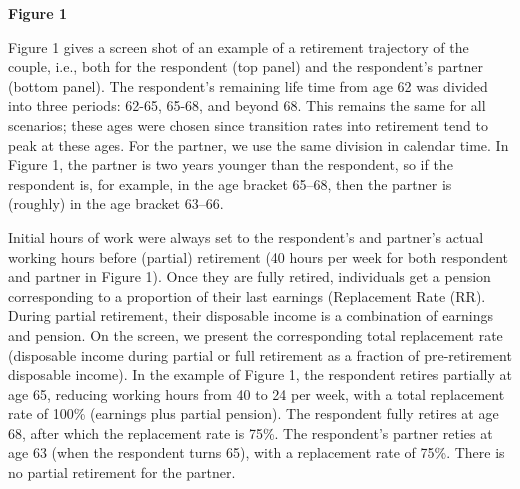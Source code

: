 \documentclass[11pt,letter]{article}
\begin{document}
\begin{center}
\textbf{Figure 1}
\end{center}

\par Figure 1 gives a screen shot of an example of a retirement trajectory of the couple, i.e., both for the respondent (top panel) and the respondent's partner (bottom panel). The respondent's remaining life time from age 62 was divided into three periods: 62-65, 65-68, and beyond 68. This remains the same for all scenarios; these ages were chosen since transition rates into retirement tend to peak at these ages. For the partner, we use the same division in calendar time. In Figure 1, the partner is two years younger than the respondent, so if the respondent is, for example, in the age bracket 65--68, then the partner is (roughly) in the age bracket 63--66.

Initial hours of work were always set to the respondent's and partner's actual working hours before (partial) retirement (40 hours per week for both respondent and partner in Figure 1). Once they are fully retired, individuals get a pension corresponding to a proportion of their last earnings (Replacement Rate (RR). During partial retirement, their disposable income is a combination of earnings and pension. On the screen, we present the corresponding total replacement rate (disposable income during partial or full retirement as a fraction of pre-retirement disposable income). In the example of Figure 1, the respondent retires partially at age 65, reducing working hours from 40 to 24 per week, with a total replacement rate of 100\% (earnings plus partial pension). The respondent fully retires at age 68, after which the replacement rate is 75\%. The respondent's partner reties at age 63 (when the respondent turns 65), with a replacement rate of 75\%. There is no partial retirement for the partner.
\end{document}
